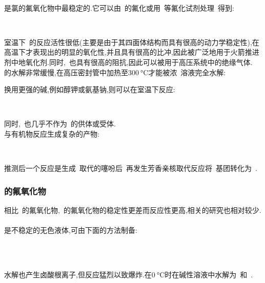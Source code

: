 \documentclass{ctexbook}
\begin{document}
\paragraph{}
是氯的氟氧化物中最稳定的.它可以由~的氟化或用~等氟化试剂处理~得到:
\begin{tightcenter}
    \\
\end{tightcenter}
室温下~的反应活性很低(主要是由于其四面体结构而具有很高的动力学稳定性),在高温下才表现出的明显的氧化性,并且具有很高的比冲,因此被广泛地用于火箭推进剂中地氧化剂.同时,~也具有很高的阻抗,因此可以被用于高压系统中的绝缘气体.\\
\indent {}的水解非常缓慢,在高压密封管中加热至$\SI{300}{\celsius}$才能被浓~溶液完全水解:
\begin{tightcenter}
\end{tightcenter}
换用更强的碱,例如醇钾或氨基钠,则可以在室温下反应:
\begin{tightcenter}
    \\
\end{tightcenter}
同时,~也几乎不作为~的供体或受体.\\
\indent {}与有机物反应生成复杂的产物:
\begin{tightcenter}
    \\
\end{tightcenter}
推测后一个反应是生成~取代的噻吩后~再发生芳香亲核取代反应将~基团转化为~.
\subsubsection{的氟氧化物}
相比~的氟氧化物,~的氟氧化物的稳定性更差而反应性更高,相关的研究也相对较少.
\paragraph{}
是不稳定的无色液体,可由下面的方法制备:
\begin{tightcenter}
    \\
    \\
\end{tightcenter}
水解也产生卤酸根离子,但反应猛烈以致爆炸.在$\SI{0}{\celsius}$时在碱性溶液中水解为~和~.
\end{document}
